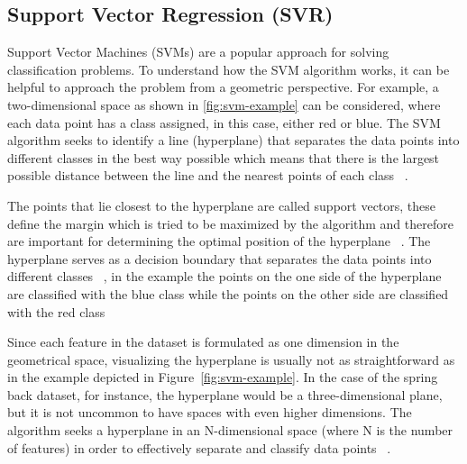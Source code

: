 
\subsection{Support Vector Regression (SVR)}\label{subsec:support-vector-regression-(svr)}
Support Vector Machines (SVMs) are a popular approach for solving classification problems.
To understand how the SVM algorithm works, it can be helpful to approach the problem from a geometric perspective.
For example, a two-dimensional space as shown in \cref{fig:svm-example} can be considered, where each data point
has a class assigned, in this case, either red or blue.
The SVM algorithm seeks to identify a line (hyperplane) that separates the data points into different classes in the
best way possible which means that there is the largest possible distance between the line and the
nearest points of each class
~\cite[pp. 92--96]{muller2016introduction}.

The points that lie closest to the hyperplane are called support vectors, these define the margin which is tried to be
maximized by the algorithm and therefore are important for determining the optimal position of the hyperplane
~\cite[p. 42]{awad2015efficient}.
The hyperplane serves as a decision boundary that separates the data points into different
classes~\cite[p. 11]{awad2015efficient}
, in the example the points on the one side of the hyperplane are classified with the blue class while the
points on the other side are classified with the red class

Since each feature in the dataset is formulated as one dimension in the geometrical space, visualizing the hyperplane
is usually not as straightforward as in the example depicted in Figure~\ref{fig:svm-example}.
In the case of the spring back dataset, for instance, the hyperplane would be a three-dimensional plane, but it is
not uncommon to have spaces with even higher dimensions.
The algorithm seeks a hyperplane in an N-dimensional space (where N is the number of features) in order to
effectively separate and classify data points
~\cite[]{awad2015efficient}.

